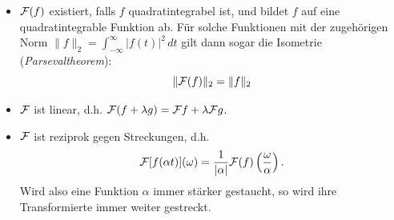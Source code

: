 \begin{itemize}
\item $\mathcal F(f)$ existiert, falls $f$ quadratintegrabel ist, und
  bildet $f$ auf eine quadratintegrable Funktion ab. Für solche
  Funktionen mit der zugehörigen Norm $\lVert f \rVert_2 =
  \int_{-\infty}^{\infty} \lvert f(t) \rvert^2\,dt$ gilt dann sogar
  die Isometrie
  (\emph{Parsevaltheorem}):
  \begin{equation}
    \lVert \mathcal F(f) \rVert_2 = \lVert f \rVert_2
  \end{equation}
\item $\mathcal F$ ist linear, d.h. $\mathcal F(f + \lambda g) = \mathcal F{f} + \lambda
  \mathcal F{g}$.
\item $\mathcal F$ ist reziprok gegen Streckungen, d.h.
  \begin{equation}
    \label{eq:fourierreziprok}
    \mathcal F[f(\alpha
    t)](\omega) = \frac{1}{\lvert \alpha \rvert}
    \mathcal F(f)\left(\frac{\omega}{\alpha}\right).
  \end{equation}
  Wird also eine Funktion $\alpha$ immer stärker gestaucht, so wird
  ihre Transformierte immer weiter gestreckt.


\end{itemize}
